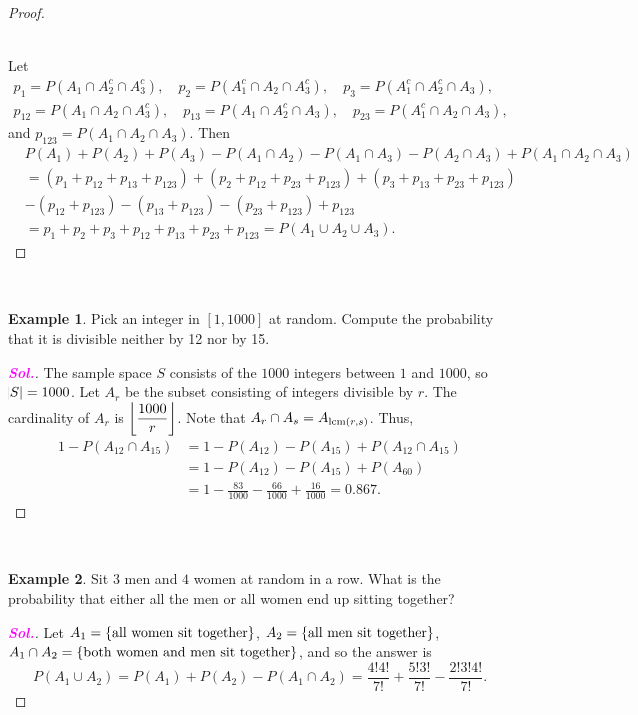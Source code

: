 \documentclass[12pt,a4paper]{article}
\DeclarePairedDelimiter\floor{\lfloor}{\rfloor}
\theoremstyle{definition}
\newtheorem{example}{Example}[section]
\theoremstyle{definition}
\theoremstyle{definition}
\theoremstyle{definition}
\theoremstyle{remark}
\theoremstyle{definition}
\newcommand{\dispsty}{\displaystyle}
\newcommand{\sol}{\textcolor{magenta}{\bf \textit{Sol.}}\quad}
\newcommand{\lcm}{\normalfont\text{lcm}}
\begin{document}
\begin{enumerate}[(C1)]
\begin{proof}
\begin{figure}[h!]
\begin{tikzpicture}[x=0.55pt,y=0.55pt,yscale=-1,xscale=1]
		
		\end{tikzpicture}
		\caption{}
	\end{figure}\ \\
	Let
	\begin{align*}
	p_1=P(A_1\cap A_2^c\cap A_3^c),\quad p_2=P(A_1^c\cap A_2\cap A_3^c),\quad p_3=P(A_1^c\cap A_2^c\cap A_3), \\
	p_{12}=P(A_1\cap A_2\cap A_3^c),\quad p_{13}=P(A_1\cap A_2^c\cap A_3),\quad p_{23}=P(A_1^c\cap A_2\cap A_3),
	\end{align*} and $p_{123}=P(A_1\cap A_2\cap A_3)$. Then \begin{align*}
	&P(A_1)+P(A_2)+P(A_3)-P(A_1\cap A_2)-P(A_1\cap A_3)-P(A_2\cap A_3)+P(A_1\cap A_2\cap A_3)\\
	&=(p_1+p_{12}+p_{13}+p_{123})+(p_2+p_{12}+p_{23}+p_{123})+(p_3+p_{13}+p_{23}+p_{123})\\
	&-(p_{12}+p_{123})-(p_{13}+p_{123})-(p_{23}+p_{123})+p_{123}\\
	&=p_1+p_2+p_3+p_{12}+p_{13}+p_{23}+p_{123}=P(A_1\cup A_2\cup A_3).
	\end{align*}
\end{proof}
\end{enumerate}
\
\begin{example}
	Pick an integer in $[1,1000]$ at random. Compute the probability that it is divisible neither by 12 nor by 15.
	\begin{proof}[\sol]
		The sample space $S$ consists of the $1000$ integers between $1$ and $1000$, so $\abs{S}=1000$. Let $A_r$ be the subset consisting of integers divisible by $r$. The cardinality of $A_r$ is $\dispsty\floor*{\frac{1000}{r}}$. Note that  $A_r\cap A_s=A_{\lcm(r,s)}$. Thus, \begin{align*}
		1-P(A_{12}\cap A_{15})&=1-P(A_{12})-P(A_{15})+P(A_{12}\cap A_{15})\\
		&=1-P(A_{12})-P(A_{15})+P(A_{60})\\
		&=1-\frac{83}{1000}-\frac{66}{1000}+\frac{16}{1000}=0.867.
		\end{align*}
	\end{proof}
\end{example}
\
\begin{example}
	Sit $3$ men and $4$ women at random in a row. What is the probability that either all the men or all women end up sitting together?
	\begin{proof}[\sol]
		Let $A_1=\set{\text{all women sit together}}$, $A_2=\set{\text{all men sit together}}$,\\ $A_1\cap A_2=\set{\text{both women and men sit together}}$, and so the answer is \[
		P(A_1\cup A_2)=P(A_1)+P(A_2)-P(A_1\cap A_2)=\frac{4!4!}{7!}+\frac{5!3!}{7!}-\frac{2!3!4!}{7!}.
		\]
	\end{proof}
\end{example}
\end{document}
